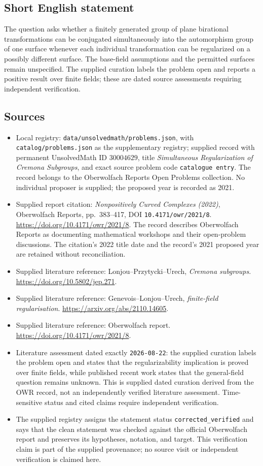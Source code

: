 \documentclass[11pt]{article}
\begin{document}
\subsection{Short English statement}
The question asks whether a finitely generated group of plane birational transformations can be conjugated simultaneously into the automorphism group of one surface whenever each individual transformation can be regularized on a possibly different surface. The base-field assumptions and the permitted surfaces remain unspecified. The supplied curation labels the problem open and reports a positive result over finite fields; these are dated source assessments requiring independent verification.
\subsection{Sources}
\begin{itemize}
\item Local registry: \texttt{data/unsolvedmath/problems.json}, with \texttt{catalog/problems.json} as the supplementary registry; supplied record with permanent UnsolvedMath ID \(30004629\), title \emph{Simultaneous Regularization of Cremona Subgroups}, and exact source problem code \texttt{catalogue entry}. The record belongs to the Oberwolfach Reports Open Problems collection. No individual proposer is supplied; the proposed year is recorded as 2021.
\item Supplied report citation: \emph{Nonpositively Curved Complexes (2022)}, Oberwolfach Reports, pp.\ 383--417, DOI \texttt{10.4171/owr/2021/8}. \url{https://doi.org/10.4171/owr/2021/8}. The record describes Oberwolfach Reports as documenting mathematical workshops and their open-problem discussions. The citation's 2022 title date and the record's 2021 proposed year are retained without reconciliation.
\item Supplied literature reference: Lonjou--Przytycki--Urech, \emph{Cremona subgroups}. \url{https://doi.org/10.5802/jep.271}.
\item Supplied literature reference: Genevois--Lonjou--Urech, \emph{finite-field regularisation}. \url{https://arxiv.org/abs/2110.14605}.
\item Supplied literature reference: Oberwolfach report. \url{https://doi.org/10.4171/owr/2021/8}.
\item Literature assessment dated exactly \texttt{2026-08-22}: the supplied curation labels the problem open and states that the regularizability implication is proved over finite fields, while published recent work states that the general-field question remains unknown. This is supplied dated curation derived from the OWR record, not an independently verified literature assessment. Time-sensitive status and cited claims require independent verification.
\item The supplied registry assigns the statement status \texttt{corrected\_verified} and says that the clean statement was checked against the official Oberwolfach report and preserves its hypotheses, notation, and target. This verification claim is part of the supplied provenance; no source visit or independent verification is claimed here.
\end{itemize}
\end{document}
